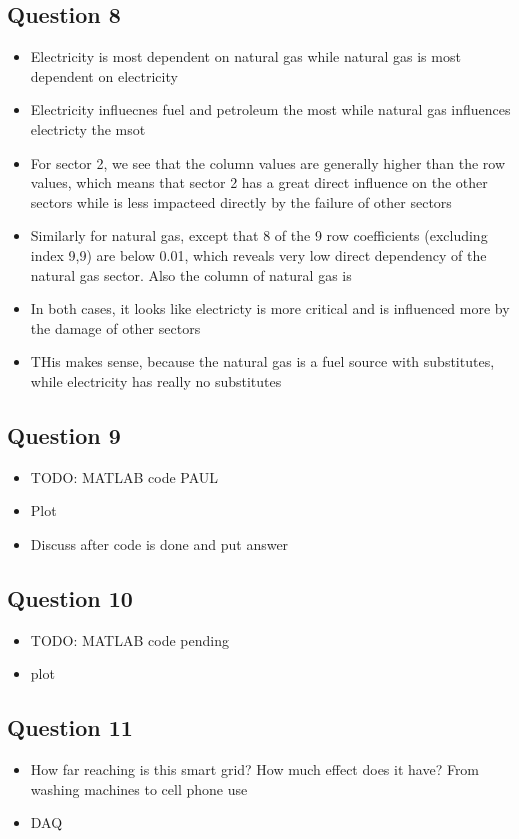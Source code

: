 \documentclass[11pt,a4paper]{article}
\begin{document}
\subsection*{Question 8}
\begin{itemize}
	\item Electricity is most dependent on natural gas while natural gas is most dependent on electricity
	\item Electricity influecnes fuel and petroleum the most while natural gas influences electricty the msot
	\item For sector 2, we see that the column values are generally higher than the row values, which means that sector 2 has a great direct influence on the other sectors while is less impacteed directly by the failure of other sectors
	\item Similarly for natural gas, except that 8 of the 9 row coefficients (excluding index 9,9) are below 0.01, which reveals very low direct dependency of the natural gas sector. Also the column of natural gas is 
	\item In both cases, it looks like electricty is more critical and is influenced more by the damage of other sectors
	\item THis makes sense, because the natural gas is a fuel source with substitutes, while electricity has really no substitutes
\end{itemize}

\subsection*{Question 9}
\begin{itemize}
	\item TODO: MATLAB code PAUL
	\item Plot
	\item Discuss after code is done and put answer
\end{itemize}


\subsection*{Question 10}
\begin{itemize}
	\item TODO: MATLAB code pending
	\item plot
\end{itemize}

\subsection*{Question 11}
\begin{itemize}
	\item How far reaching is this smart grid? How much effect does it have? From washing machines to cell phone use
	\item DAQ
\end{itemize}
\end{document}
